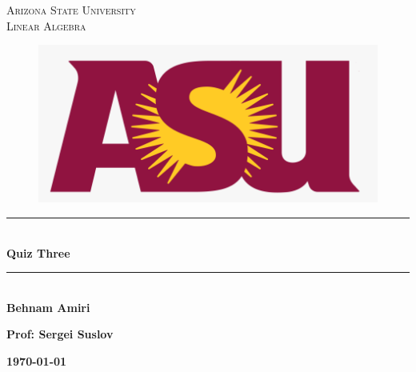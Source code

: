 \documentclass[fleqn]{article}
\begin{document}
  \begin{titlepage}

    \newcommand{\HRule}{\rule{\linewidth}{0.5mm}}

    \center


    \textsc{\LARGE Arizona State University}\\[1.5cm]

    \textsc{\LARGE Linear Algebra }\\[1.5cm]


    \begin{figure}
      \includegraphics[width=\linewidth]{asu.png}
    \end{figure}


    \HRule \\[0.4cm]
    { \huge \bfseries Quiz Three}\\[0.4cm] 
    \HRule \\[1.5cm]

    \textbf{Behnam Amiri}

    \bigbreak

    \textbf{Prof: Sergei Suslov}

    \bigbreak


    \textbf{{\large \today}\\[2cm]}

    \vfill

  \end{titlepage}
\end{document}
